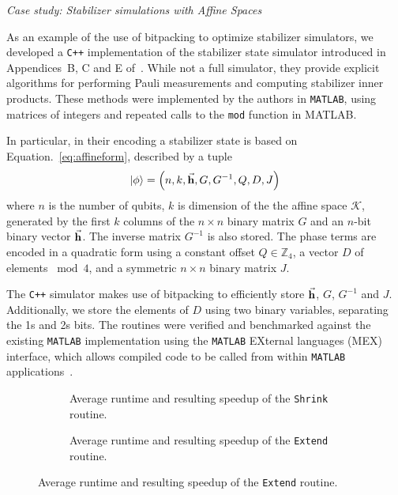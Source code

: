 \large{\itshape{Case study: Stabilizer simulations with Affine Spaces}}\par
As an example of the use of bitpacking to optimize stabilizer simulators, we developed a \texttt{C++} implementation of the stabilizer state simulator introduced in Appendices~B, C and E of~\cite{Bravyi2016}. While not a full simulator, they provide explicit algorithms for performing Pauli measurements and computing stabilizer inner products. These methods were implemented by the authors in \texttt{MATLAB}, using matrices of integers and repeated calls to the \texttt{mod} function in MATLAB.\par
In particular, in their encoding a stabilizer state is based on Equation.~\ref{eq:affineform}, described by a tuple
\[\ket{\phi} = \left(n, k, \va{h}, G, G^{-1}, Q, D, J\right)\]
where $n$ is the number of qubits, $k$ is dimension of the the affine space $\mathcal{K}$, generated by the first $k$ columns of the $n\times n$ binary matrix $G$ and an $n$-bit binary vector $\va{h}$. The inverse matrix $G^{-1}$ is also stored. The phase terms are encoded in a quadratic form using a constant offset $Q\in\mathbb{Z}_{4}$, a vector $D$ of elements $\bmod{4}$, and a symmetric $n\times n$ binary matrix $J$.\par
The \texttt{C++} simulator makes use of bitpacking to efficiently store $\va{h}$, $G$, $G^{-1}$ and $J$. Additionally, we store the elements of $D$ using two binary variables, separating the 1s and 2s bits. The routines were verified and benchmarked against the existing \texttt{MATLAB} implementation using the \texttt{MATLAB} EXternal languages (MEX) interface, which allows compiled code to be called from within \texttt{MATLAB} applications~\cite{MEXRef}.\par
\begin{figure}[p]
\centering
\caption{Figures showing the performance of the \texttt{MATLAB} and \texttt{C++} implementations of a stabilize simulator based on Affine Spaces.}\label{fig:affine_timings}
\begin{subfigure}[t]{0.9\textwidth}
    \begin{scaletikzpicturetowidth}{\textwidth}
        
    \end{scaletikzpicturetowidth}
    \caption{Average runtime and resulting speedup of the \texttt{Shrink} routine.}
\end{subfigure}
\begin{subfigure}[t]{0.9\textwidth}
    \caption{Average runtime and resulting speedup of the \texttt{Extend} routine.}
    \begin{scaletikzpicturetowidth}{\textwidth}
        
    \end{scaletikzpicturetowidth}
\end{subfigure}
\end{figure}

